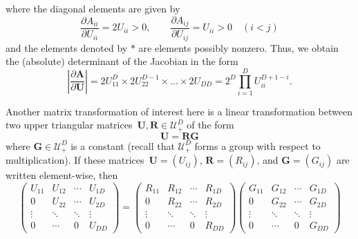 \documentclass[12pt,a4paper]{article}
\begin{document}
where the diagonal elements are given by
\begin{equation}
\frac{\partial A_{ii}}{\partial U_{ii}} = 2 U_{ii} > 0, \qquad
\frac{\partial A_{ij}}{\partial U_{ij}} = U_{ii} > 0 \quad (i < j)
\end{equation}
and the elements denoted by $\ast$ are elements possibly nonzero.
Thus, we obtain the (absolute) determinant of the Jacobian in the form
\begin{equation}
\left| \frac{\partial\mathbf{A}}{\partial\mathbf{U}} \right| =
2 U_{11}^{D} \times 2 U_{22}^{D - 1} \times \dots \times 2 U_{DD} =
2^D \prod_{i=1}^{D} U_{ii}^{D + 1 - i} .
\label{eq:jacobian_of_cholesky_decomposition}
\end{equation}

Another matrix transformation of interest here is a linear transformation between
two upper triangular matrices~$\mathbf{U}, \mathbf{R} \in \mathcal{U}_{+}^{D}$
of the form
\begin{equation}
\mathbf{U} = \mathbf{R} \mathbf{G}
\end{equation}
where $\mathbf{G} \in \mathcal{U}_{+}^{D}$ is a constant
(recall that $\mathcal{U}_{+}^{D}$ forms a group with respect to multiplication).
If these matrices~$\mathbf{U} = \left(U_{ij}\right)$, $\mathbf{R} = \left(R_{ij}\right)$,
and $\mathbf{G} = \left(G_{ij}\right)$ are written element-wise, then
\begin{equation}
\begin{pmatrix}
U_{11} & U_{12} & \cdots & U_{1D} \\
0      & U_{22} & \cdots & U_{2D} \\
\vdots & \ddots & \ddots & \vdots \\
0      & \cdots & 0      & U_{DD}
\end{pmatrix}
=
\begin{pmatrix}
R_{11} & R_{12} & \cdots & R_{1D} \\
0      & R_{22} & \cdots & R_{2D} \\
\vdots & \ddots & \ddots & \vdots \\
0      & \cdots & 0      & R_{DD}
\end{pmatrix}
\begin{pmatrix}
G_{11} & G_{12} & \cdots & G_{1D} \\
0      & G_{22} & \cdots & G_{2D} \\
\vdots & \ddots & \ddots & \vdots \\
0      & \cdots & 0      & G_{DD}
\end{pmatrix}
\end{equation}
\end{document}
